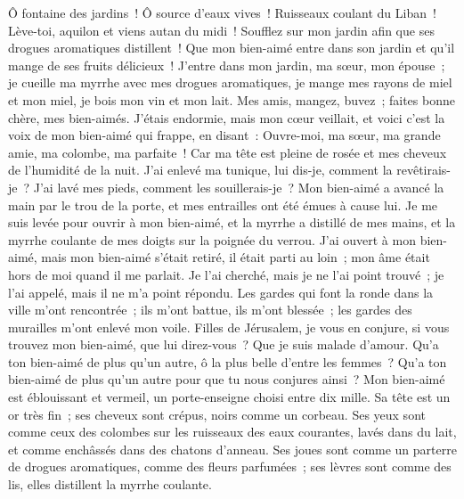 \begin{multicols}{2}
Ô fontaine des jardins~! Ô source d'eaux vives~! Ruisseaux coulant du Liban~!
Lève-toi, aquilon et viens autan du midi~! Soufflez sur mon jardin afin que ses drogues aromatiques distillent~!  Que mon bien-aimé entre dans son jardin et qu'il mange de ses fruits délicieux~!
\VerseOne{} J'entre dans mon jardin, ma sœur, mon épouse~; je cueille ma myrrhe avec mes drogues aromatiques, je mange mes rayons de miel et mon miel, je bois mon vin et mon lait. Mes amis, mangez, buvez~; faites bonne chère, mes bien-aimés.
 J'étais endormie, mais mon cœur veillait, et voici c'est la voix de mon bien-aimé qui frappe, en disant~:  Ouvre-moi, ma sœur, ma grande amie, ma colombe, ma parfaite~! Car ma tête est pleine de rosée et mes cheveux de l'humidité de la nuit.
 J'ai enlevé ma tunique, lui dis-je, comment la revêtirais-je~? J'ai lavé mes pieds, comment les souillerais-je~?
Mon bien-aimé a avancé la main par le trou de la porte, et mes entrailles ont été émues à cause lui.
Je me suis levée pour ouvrir à mon bien-aimé, et la myrrhe a distillé de mes mains, et la myrrhe coulante de mes doigts sur la poignée du verrou.
J'ai ouvert à mon bien-aimé, mais mon bien-aimé s'était retiré, il était parti au loin~; mon âme était hors de moi quand il me parlait. Je l'ai cherché, mais je ne l'ai point trouvé~; je l'ai appelé, mais il ne m'a point répondu.
Les gardes qui font la ronde dans la ville m'ont rencontrée~; ils m'ont battue, ils m'ont blessée~; les gardes des murailles m'ont enlevé mon voile.
Filles de Jérusalem, je vous en conjure, si vous trouvez mon bien-aimé, que lui direz-vous~? Que je suis malade d'amour.
 Qu'a ton bien-aimé de plus qu'un autre, ô la plus belle d'entre les femmes~? Qu'a ton bien-aimé de plus qu'un autre pour que tu nous conjures ainsi~?
 Mon bien-aimé est éblouissant et vermeil, un porte-enseigne choisi entre dix mille.
Sa tête est un or très fin~; ses cheveux sont crépus, noirs comme un corbeau.
Ses yeux sont comme ceux des colombes sur les ruisseaux des eaux courantes, lavés dans du lait, et comme enchâssés dans des chatons d'anneau.
Ses joues sont comme un parterre de drogues aromatiques, comme des fleurs parfumées~; ses lèvres sont comme des lis, elles distillent la myrrhe coulante.

\end{multicols}
